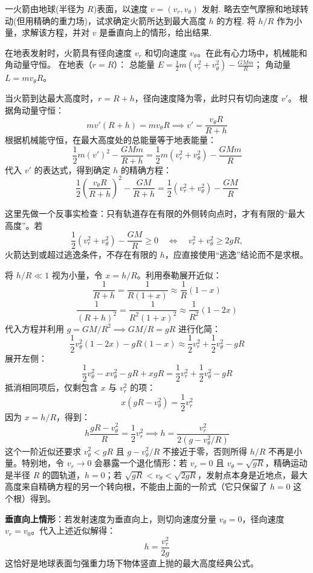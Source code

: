 \begin{exercise}\label{ex:4.8}
一火箭由地球(半径为 $R$)表面，以速度 $v = (v_r, v_\theta)$ 发射. 略去空气摩擦和地球转动(但用精确的重力场)，试求确定火箭所达到最大高度 $h$ 的方程. 将 $h/R$ 作为小量，求解该方程，并对 $v$ 是垂直向上的情形，给出结果.
\end{exercise}
\begin{solution}
在地表发射时，火箭具有径向速度 $v_r$ 和切向速度 $v_\theta$。在此有心力场中，机械能和角动量守恒。
在地表（$r = R$）：
总能量 $E = \frac{1}{2}m(v_r^2 + v_\theta^2) - \frac{GMm}{R}$；
角动量 $L = m v_\theta R$。

当火箭到达最大高度时，$r = R + h$，径向速度降为零，此时只有切向速度 $v'$。
根据角动量守恒：
$$ m v' (R+h) = m v_\theta R \implies v' = \frac{v_\theta R}{R+h} $$
根据机械能守恒，在最大高度处的总能量等于地表能量：
$$ \frac{1}{2}m (v')^2 - \frac{GMm}{R+h} = \frac{1}{2}m(v_r^2 + v_\theta^2) - \frac{GMm}{R} $$
代入 $v'$ 的表达式，得到确定 $h$ 的精确方程：
$$ \frac{1}{2} \left( \frac{v_\theta R}{R+h} \right)^2 - \frac{GM}{R+h} = \frac{1}{2}(v_r^2 + v_\theta^2) - \frac{GM}{R} $$

这里先做一个反事实检查：只有轨道存在有限的外侧转向点时，才有有限的“最大高度”。若
$$ \frac12(v_r^2+v_\theta^2)-\frac{GM}{R}\ge0
\quad\Longleftrightarrow\quad
v_r^2+v_\theta^2\ge2gR, $$
火箭达到或超过逃逸条件，不存在有限的 $h$，应直接使用“逃逸”结论而不是求根。

将 $h/R \ll 1$ 视为小量，令 $x = h/R$。利用泰勒展开近似：
$$ \frac{1}{R+h} = \frac{1}{R(1+x)} \approx \frac{1}{R}(1 - x) $$
$$ \frac{1}{(R+h)^2} = \frac{1}{R^2(1+x)^2} \approx \frac{1}{R^2}(1 - 2x) $$
代入方程并利用 $g = GM/R^2 \implies GM/R = gR$ 进行化简：
$$ \frac{1}{2}v_\theta^2 (1 - 2x) - gR(1 - x) \approx \frac{1}{2}v_r^2 + \frac{1}{2}v_\theta^2 - gR $$
展开左侧：
$$ \frac{1}{2}v_\theta^2 - x v_\theta^2 - gR + x gR = \frac{1}{2}v_r^2 + \frac{1}{2}v_\theta^2 - gR $$
抵消相同项后，仅剩包含 $x$ 与 $v_r^2$ 的项：
$$ x (gR - v_\theta^2) = \frac{1}{2}v_r^2 $$
因为 $x = h/R$，得到：
$$ h \frac{gR - v_\theta^2}{R} = \frac{1}{2}v_r^2 \implies h = \frac{v_r^2}{2(g - v_\theta^2/R)} $$
这个一阶近似还要求 $v_\theta^2<gR$ 且 $g-v_\theta^2/R$ 不接近于零，否则所得 $h/R$ 不再是小量。特别地，令 $v_r\to0$ 会暴露一个退化情形：若 $v_r=0$ 且 $v_\theta=\sqrt{gR}$，精确运动是半径 $R$ 的圆轨道，$h=0$；若 $\sqrt{gR}<v_\theta<\sqrt{2gR}$，发射点本身是近地点，最大高度来自精确方程的另一个转向根，不能由上面的一阶式（它只保留了 $h=0$ 这个根）得到。

\textbf{垂直向上情形}：若发射速度为垂直向上，则切向速度分量 $v_\theta = 0$，径向速度 $v_r = v_0$。代入上述近似解得：
$$ h = \frac{v_r^2}{2g} $$
这恰好是地球表面匀强重力场下物体竖直上抛的最大高度经典公式。
\end{solution}

